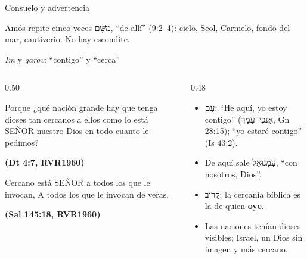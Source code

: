 \documentclass[hyperref={bookmarks=false},aspectratio=169]{beamer}
\newcommand{\heb}[1]{\mbox{\foreignlanguage{hebrew}{#1}}}
\newcommand{\SENOR}{S{\fontsize{0.78em}{1em}\selectfont EÑOR}}
\newcommand{\fuente}[1]{\par\hfill{\upshape\bfseries\footnotesize\textcolor{azul}{#1}}}
\newcommand{\destacar}[1]{\textbf{\textcolor{azul}{#1}}}
\begin{document}
\begin{frame}{Consuelo y advertencia}
\centering
{}\par\medskip
\small\RaggedRight Amós repite cinco veces \heb{מִשָּׁם}, ``de allí'' (9:2--4): cielo, Seol, Carmelo, fondo del mar, cautiverio. No hay escondite.
\end{frame}

\begin{frame}{\emph{Im} y \emph{qarov}: ``contigo'' y ``cerca''}
\begin{columns}[t,onlytextwidth]
\begin{column}{0.50\textwidth}
\begin{cita}[fontupper=\scriptsize\itshape]Porque ¿qué nación grande hay que tenga dioses tan cercanos a ellos como lo está \SENOR{} nuestro Dios en todo cuanto le pedimos?\fuente{(Dt 4:7, RVR1960)}\end{cita}
\begin{cita}[fontupper=\scriptsize\itshape]Cercano está \SENOR{} a todos los que le invocan, A todos los que le invocan de veras.\fuente{(Sal 145:18, RVR1960)}\end{cita}
\end{column}
\begin{column}{0.48\textwidth}\small
\begin{itemize}
\item \heb{עִם}: ``He aquí, yo estoy contigo'' (\heb{אָנֹכִי עִמָּךְ}, Gn 28:15); ``yo estaré contigo'' (Is 43:2).
\item De aquí sale \heb{עִמָּנוּאֵל}, ``con nosotros, Dios''.
\item \heb{קָרוֹב}: la cercanía bíblica es la de quien \destacar{oye}.
\item Las naciones tenían dioses visibles; Israel, un Dios sin imagen y más cercano.
\end{itemize}
\end{column}
\end{columns}
\end{frame}
\end{document}
